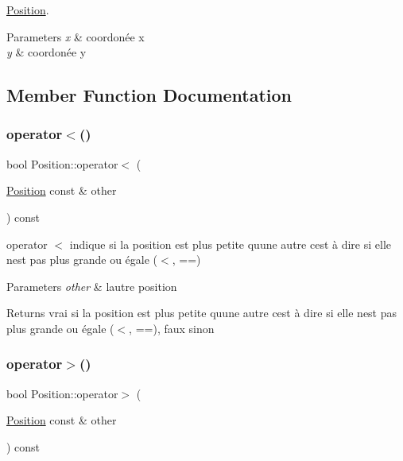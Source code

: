 \mbox{\hyperlink{class_position}{Position}}. 


\begin{DoxyParams}{Parameters}
{\em x} & coordonée x \\
\hline
{\em y} & coordonée y \\
\hline
\end{DoxyParams}


\subsection{Member Function Documentation}
\mbox{\label{class_position_a7b6d74a3e3de3cd9f689e82df0fccfd7}} 
\subsubsection{\texorpdfstring{operator$<$()}{operator<()}}
{\footnotesize\ttfamily bool Position\+::operator$<$ (\begin{DoxyParamCaption}\item[{\mbox{\hyperlink{class_position}{Position}} const \&}]{other }\end{DoxyParamCaption}) const}



operator $<$ indique si la position est plus petite qu\textquotesingle{}une autre c\textquotesingle{}est à dire si elle n\textquotesingle{}est pas plus grande ou égale ($<$, ==) 


\begin{DoxyParams}{Parameters}
{\em other} & l\textquotesingle{}autre position \\
\hline
\end{DoxyParams}
\begin{DoxyReturn}{Returns}
vrai si la position est plus petite qu\textquotesingle{}une autre c\textquotesingle{}est à dire si elle n\textquotesingle{}est pas plus grande ou égale ($<$, ==), faux sinon 
\end{DoxyReturn}
\mbox{\label{class_position_a4ac05a6dc928c47019dff3b5c9eb8e86}} 
\subsubsection{\texorpdfstring{operator$>$()}{operator>()}}
{\footnotesize\ttfamily bool Position\+::operator$>$ (\begin{DoxyParamCaption}\item[{\mbox{\hyperlink{class_position}{Position}} const \&}]{other }\end{DoxyParamCaption}) const}



